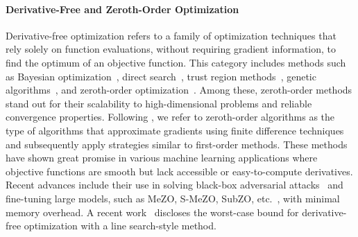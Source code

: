 \documentclass[10pt]{article} %
\numberwithin{equation}{section}
\theoremstyle{plain}
\theoremstyle{definition}
\newcommand{\<}{\langle}
\renewcommand{\>}{\rangle}
\renewcommand{\(}{\left(}
\renewcommand{\)}{\right)}
\renewcommand{\[}{\left[}
\renewcommand{\]}{\right]}
\begin{document}

\paragraph{Derivative-Free and Zeroth-Order Optimization}
Derivative-free optimization refers to a family of optimization techniques that rely solely on function evaluations, without requiring gradient information, to find the optimum of an objective function. This category includes methods such as Bayesian optimization~\citep{shahriari2015bayesian}, direct search~\citep{kolda2003direct}, trust region methods~\citep{conn2000trust}, genetic algorithms~\citep{srinivas1994genetic}, and zeroth-order optimization~\citep{liu2020primer}. Among these, zeroth-order methods stand out for their scalability to high-dimensional problems and reliable convergence properties. Following \citet{liu2020primer}, we refer to zeroth-order algorithms as the type of algorithms that approximate gradients using finite difference techniques and subsequently apply strategies similar to first-order methods. These methods have shown great promise in various machine learning applications where objective functions are smooth but lack accessible or easy-to-compute derivatives. Recent advances include their use in solving black-box adversarial attacks~\citep{chen2017zoo, chen2023deepzero} and fine-tuning large models, such as MeZO, S-MeZO, SubZO, etc.~\citep{sun2022bbtv2, sun2022black, malladi2023fine, liu2024sparse, yu2024subzero, zhang2024revisiting}, with minimal memory overhead.
A recent work~\citep{brilli2024worst} discloses the worst-case bound for derivative-free optimization with a line search-style method. 
\end{document}
